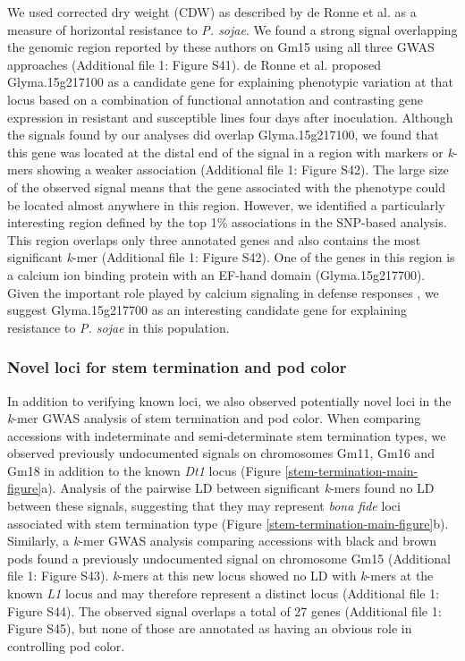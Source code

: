 \documentclass{article}
\begin{document}
We used corrected dry weight (CDW) as described by de Ronne et al. \cite{deronne2022} as a
measure of horizontal resistance to \emph{P. sojae}. We found a strong signal
overlapping the genomic region reported by these authors on Gm15 using all three GWAS
approaches (Additional file 1: Figure S41). de Ronne et al. \cite{deronne2022}
proposed Glyma.15g217100 as a candidate gene for explaining phenotypic
variation at that locus based on a combination of functional annotation and
contrasting gene expression in resistant and susceptible lines four days after
inoculation. Although the signals found by our analyses did overlap
Glyma.15g217100, we found that this gene was located at the distal end of the signal
in a region with markers or \emph{k}-mers showing a weaker
association (Additional file 1: Figure S42). The
large size of the observed signal means that the gene associated with the phenotype could
be located almost anywhere in this region. However, we identified a particularly
interesting region defined by the top 1\% associations in the SNP-based
analysis. This region overlaps only three annotated genes and also contains the
most significant \emph{k}-mer (Additional file 1: Figure
S42). One of the genes in this region is
a calcium ion binding protein with an EF-hand domain (Glyma.15g217700).
Given the important role played by calcium signaling in defense
responses \citep{zhang2014}, we suggest Glyma.15g217700 as an interesting
candidate gene for explaining resistance to \emph{P. sojae} in this population.

\subsubsection*{Novel loci for stem termination and pod color}

In addition to verifying known loci, we also observed potentially novel loci in
the \textit{k}-mer GWAS analysis of stem termination and pod color.  When
comparing accessions with indeterminate and semi-determinate stem termination
types, we observed previously undocumented signals on chromosomes Gm11, Gm16
and Gm18 in addition to the known \textit{Dt1} locus (Figure
\ref{stem-termination-main-figure}a).  Analysis of the pairwise LD between
significant \textit{k}-mers found no LD between these signals, suggesting that
they may represent \textit{bona fide} loci associated with stem termination
type (Figure \ref{stem-termination-main-figure}b). Similarly, a \textit{k}-mer
GWAS analysis comparing accessions with black and brown pods found a previously
undocumented signal on chromosome Gm15 (Additional file 1: Figure S43).
\textit{k}-mers at this new locus
showed no LD with \textit{k}-mers at the known \textit{L1} locus and may
therefore represent a distinct locus (Additional file 1: Figure 
S44). The observed signal overlaps a total of 27 genes
(Additional file 1: Figure S45), but none of those are annotated
as having an obvious role in controlling pod color.
\end{document}
